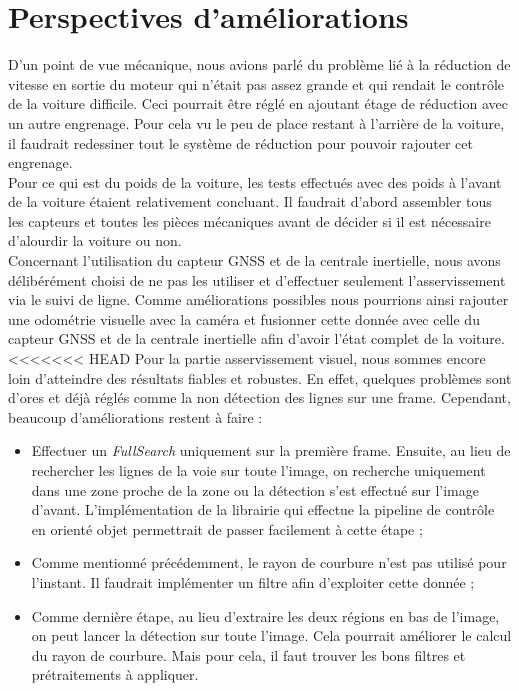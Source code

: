 \documentclass[12pt, openany]{report}
\begin{document}
\section{Perspectives d'améliorations}
D'un point de vue mécanique, nous avions parlé du problème lié à la réduction de vitesse en sortie du moteur qui n'était pas assez grande et qui rendait le contrôle de la voiture difficile. Ceci pourrait être réglé en ajoutant étage de réduction avec un autre engrenage. Pour cela vu le peu de place restant à l'arrière de la voiture, il faudrait redessiner tout le système de réduction pour pouvoir rajouter cet engrenage.\\

Pour ce qui est du poids de la voiture, les tests effectués avec des poids à l'avant de la voiture étaient relativement concluant. Il faudrait d'abord assembler tous les capteurs et toutes les pièces mécaniques avant de décider si il est nécessaire d'alourdir la voiture ou non.\\

Concernant l'utilisation du capteur GNSS et de la centrale inertielle, nous avons délibérément choisi de ne pas les utiliser et d'effectuer seulement l'asservissement via le suivi de ligne. Comme améliorations possibles nous pourrions ainsi rajouter une odométrie visuelle avec la caméra et fusionner cette donnée avec celle du capteur GNSS et de la centrale inertielle afin d'avoir l'état complet de la voiture.\\ 

<<<<<<< HEAD
Pour la partie asservissement visuel, nous sommes encore loin d'atteindre des résultats fiables et robustes. En effet, quelques problèmes sont d'ores et déjà réglés comme la non détection des lignes sur une frame. Cependant, beaucoup d'améliorations restent à faire :
\begin{itemize}[label=\textbullet, font=\small]
    \item Effectuer un \textit{FullSearch} uniquement sur la première frame. Ensuite, au lieu de rechercher les lignes de la voie sur toute l'image, on recherche uniquement dans une zone proche de la zone ou la détection s'est effectué sur l'image d'avant. L'implémentation de la librairie qui effectue la pipeline de contrôle en orienté objet permettrait de passer facilement à cette étape ;
    \item Comme mentionné précédemment, le rayon de courbure n'est pas utilisé pour l'instant. Il faudrait implémenter un filtre afin d'exploiter cette donnée ;
    \item Comme dernière étape, au lieu d'extraire les deux régions en bas de l'image, on peut lancer la détection sur toute l'image. Cela pourrait améliorer le calcul du rayon de courbure. Mais pour cela, il faut trouver les bons filtres et prétraitements à appliquer.\\ 
\end{itemize}
\end{document}
